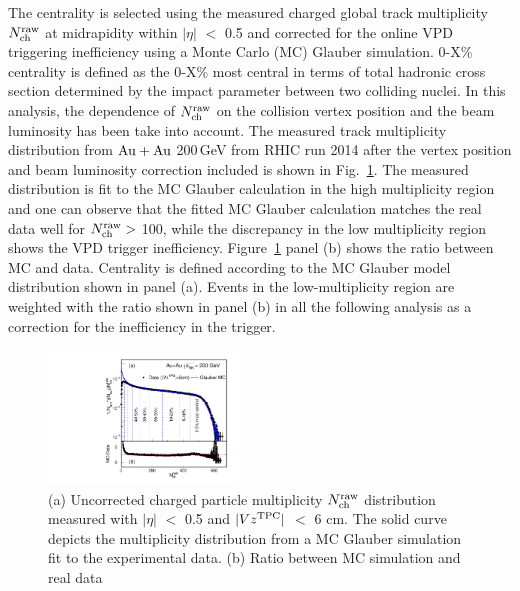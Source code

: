 \documentclass[%
 reprint,	
 amsmath,amssymb,
 aps,
 prc,
]{revtex4-1}
\begin{document}
The centrality is selected using the measured charged global track multiplicity $N_{\rm ch}^{\rm raw}$ at midrapidity within $|\eta|$ $<$ 0.5 and corrected for the online VPD triggering inefficiency using a Monte Carlo (MC) Glauber simulation. 0-X\% centrality is defined as the 0-X\% most central in terms of total hadronic cross section determined by the impact parameter between two colliding nuclei. In this analysis, the dependence of $N_{\rm ch}^{\rm raw}$ on the collision vertex position and the beam luminosity has been take into account. The measured track multiplicity distribution from ${\rm{Au + Au}}$ 200\,GeV from RHIC run 2014 after the vertex position and beam luminosity correction included is shown in Fig.~\ref{fig:centrality}. The measured distribution is fit to the MC Glauber calculation in the high multiplicity region and one can observe that the fitted MC Glauber calculation matches the real data well for $N_{\rm ch}^{\rm raw} >$ 100, while the discrepancy in the low multiplicity region shows the VPD trigger inefficiency. Figure~\ref{fig:centrality} panel (b) shows the ratio between MC and data. Centrality is defined according to the MC Glauber model distribution shown in panel (a). Events in the low-multiplicity region are weighted with the ratio shown in panel (b) in all the following analysis as a correction for the inefficiency in the trigger.

\begin{figure}[h]
\centering
\includegraphics[width=0.45\textwidth]{fig/centrality.pdf}
  \caption{(a) Uncorrected charged particle multiplicity $N_{\rm ch}^{\rm raw}$ distribution measured with $|\eta|$ $<$ 0.5 and $|Vz^{\rm{TPC}}|$ $<$ 6 cm. The solid curve depicts the multiplicity distribution from a MC Glauber simulation fit to the experimental data. (b) Ratio between MC simulation and real data}
\label{fig:centrality} 
\end{figure}
\end{document}
